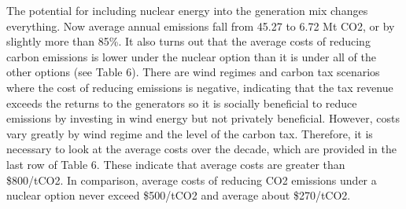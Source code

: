 The potential for including nuclear energy into the generation mix changes everything. Now average annual emissions fall from 45.27 to 6.72 Mt CO2, or by slightly more than 85\%. It also turns out that the average costs of reducing carbon emissions is lower under the nuclear option than it is under all of the other options (see Table 6). There are wind regimes and carbon tax scenarios where the cost of reducing emissions is negative, indicating that the tax revenue exceeds the returns to the generators so it is socially beneficial to reduce emissions by investing in wind energy but not privately beneficial.  However, costs vary greatly by wind regime and the level of the carbon tax. Therefore, it is necessary to look at the average costs over the decade, which are provided in the last row of Table 6. These indicate that average costs are greater than \$800/tCO2. In comparison, average costs of reducing CO2 emissions under a nuclear option never exceed \$500/tCO2 and average about \$270/tCO2.  



